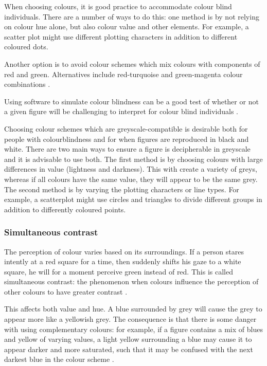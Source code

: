 \documentclass[letterpaper]{article}
\begin{document}
When choosing colours, it is good practice to accommodate colour blind individuals. There are a number of ways to do this: one method is by not relying on colour hue alone, but also colour value and other elements. For example, a scatter plot might use different plotting characters in addition to different coloured dots. 

Another option is to avoid colour schemes which mix colours with components of red and green. Alternatives include red-turquoise and green-magenta colour combinations \cite{wong4}.

Using software to simulate colour blindness can be a good test of whether or not a given figure will be challenging to interpret for colour blind individuals \cite{wong4}.

Choosing colour schemes which are greyscale-compatible is desirable both for people with colourblindness and for when figures are reproduced in black and white. There are two main ways to ensure a figure is decipherable in greyscale and it is advisable to use both. The first method is by choosing colours with large differences in value (lightness and darkness). This with create a variety of greys, whereas if all colours have the same value, they will appear to be the same grey. The second method is by varying the plotting characters or line types. For example, a scatterplot might use circles and triangles to divide different groups in addition to differently coloured points. 

\subsubsection{Simultaneous contrast}
The perception of colour varies based on its surroundings. If a person stares intently at a red square for a time, then suddenly shifts his gaze to a white square, he will for a moment perceive green instead of red. This is called simultaneous contrast: the phenomenon when colours influence the perception of other colours to have greater contrast \cite{albers}. 

This affects both value and hue. A blue surrounded by grey will cause the grey to appear more like a yellowish grey. The consequence is that there is some danger with using complementary colours: for example, if a figure contains a mix of blues and yellow of varying values, a light yellow surrounding a blue may cause it to appear darker and more saturated, such that it may be confused with the next darkest blue in the colour scheme \cite{brewers-sim}. 
\end{document}
